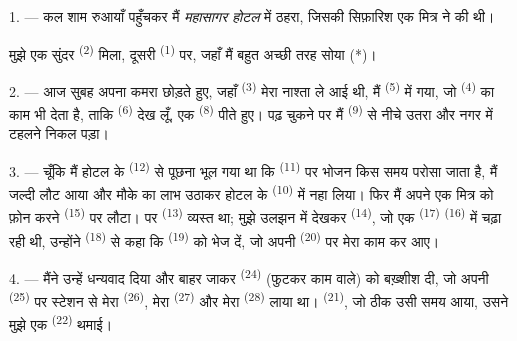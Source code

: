 %


\VUsaut{3.0mm}
\VUsaut{1.6mm}
\VUsaut{2.0mm}
\VUsaut{3.4mm}

1. --- कल शाम रुआयाँ पहुँचकर मैं \textit{महासागर होटल} में ठहरा, जिसकी सिफ़ारिश
एक मित्र ने की थी।

मुझे एक सुंदर  \textsuperscript{(2)} मिला, दूसरी
 \textsuperscript{(1)} पर, जहाँ मैं बहुत अच्छी तरह सोया (*)।

2. --- आज सुबह अपना कमरा छोड़ते हुए, जहाँ  \textsuperscript{(3)}
मेरा नाश्ता ले आई थी, मैं  \textsuperscript{(5)} में गया,
जो  \textsuperscript{(4)} का काम भी देता है, ताकि 
\textsuperscript{(6)} देख लूँ, एक  \textsuperscript{(8)} पीते
हुए। पढ़ चुकने पर मैं  \textsuperscript{(9)} से नीचे उतरा और
नगर में टहलने निकल पड़ा।

3. --- चूँकि मैं होटल के  \textsuperscript{(12)} से पूछना भूल गया था
कि  \textsuperscript{(11)} पर भोजन किस समय परोसा जाता है,
मैं जल्दी लौट आया और मौके का लाभ उठाकर होटल के 
\textsuperscript{(10)} में नहा लिया। फिर मैं अपने एक मित्र को फ़ोन करने
 \textsuperscript{(15)} पर लौटा। पर 
\textsuperscript{(13)} व्यस्त था; मुझे उलझन में देखकर 
\textsuperscript{(14)}, जो एक  \textsuperscript{(17)}
 \textsuperscript{(16)} में चढ़ा रही थी, उन्होंने
 \textsuperscript{(18)} से कहा कि 
\textsuperscript{(19)} को भेज दें, जो अपनी  \textsuperscript{(20)}
पर मेरा काम कर आए।

4. --- मैंने उन्हें धन्यवाद दिया और बाहर जाकर  \textsuperscript{(24)}
(फुटकर काम वाले) को बख़्शीश दी, जो अपनी  \textsuperscript{(25)}
पर स्टेशन से मेरा  \textsuperscript{(26)}, मेरा
 \textsuperscript{(27)} और मेरा 
\textsuperscript{(28)} लाया था।  \textsuperscript{(21)}, जो ठीक उसी
समय आया, उसने मुझे एक  \textsuperscript{(22)} थमाई।


